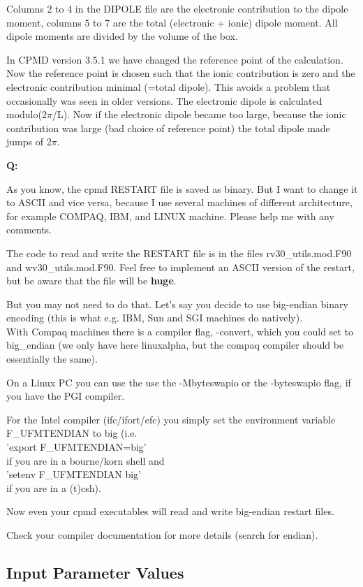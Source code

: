 \documentclass[twoside,10pt,titlepage,a4paper]{article}
\newcommand{\reflabel}[1]{\hypertarget{#1}}
\newcommand{\reflabel}[1]{\label{#1}}
\newcommand{\faqquestion}[1]{\vspace{2ex}\reflabel{faq#1}{{\bf Q:\ }}}
\newcommand{\faqanswer}{\vspace{1ex}{{\bf A:\ }}}
\begin{document}
\faqanswer
Columns 2 to 4 in the DIPOLE file are the electronic
contribution to the dipole moment, columns 5 to 7 are
the total (electronic + ionic) dipole moment.
All dipole moments are divided by the volume of the box.

In CPMD version 3.5.1 we have changed the reference point
of the calculation. Now the reference point is chosen such
that the ionic contribution is zero and the electronic
contribution minimal (=total dipole). This avoids
a problem that occasionally was seen in older versions.
The electronic dipole is calculated modulo(2$\pi$/L).
Now if the electronic dipole became too large, because
the ionic contribution was large (bad choice of reference
point) the total dipole made jumps of 2$\pi$.

\faqquestion{restart}
As you know, the cpmd RESTART file is saved as binary.
But I want to change it to ASCII and vice versa, because I use several
machines of different architecture, for example COMPAQ, IBM, and
LINUX machine. Please help me with any comments.

\faqanswer
The code to read and write the RESTART file is in the files rv30\_utils.mod.F90
and wv30\_utils.mod.F90. Feel free to implement an ASCII version of the restart,
but be aware that the file will be \textbf{huge}.

But you may not need to do that. Let's say you decide to use big-endian
binary encoding (this is what e.g. IBM, Sun and SGI machines do
natively).\\
With Compaq machines there is a compiler flag, -convert,
which you could set to big\_endian (we only have here
linuxalpha, but the compaq compiler should be essentially the same).

On a Linux PC you can use the use the -Mbyteswapio or
the -byteswapio flag, if you have the PGI compiler.

For the Intel compiler (ifc/ifort/efc) you simply set the environment
variable F\_UFMTENDIAN to big (i.e.\\'export F\_UFMTENDIAN=big'\\if you are in
a bourne/korn shell and\\'setenv F\_UFMTENDIAN big'\\if you are in a (t)csh).

Now even your cpmd executables will read and write big-endian
restart files.

Check your compiler documentation for more details (search for endian).


\subsection{Input Parameter Values}
\label{sec:input-param-valu}
\end{document}
